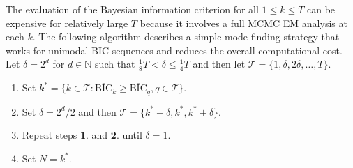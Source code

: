 \documentclass{bioinfo}
\begin{document}
The evaluation of the Bayesian information criterion for all
$1\leqslant k \leqslant T$ can be expensive for relatively large $T$
because it involves a full MCMC EM analysis at each $k$. The following
algorithm describes a simple mode finding strategy that works for
unimodal BIC sequences and reduces the overall computational cost. Let
$\delta = 2^d$ for $d \in \mathbb N$ such that $\frac{1}{8}T < \delta
\leqslant \frac{1}{4}T$ and then let $\mathcal T = \{1, \delta,
2\delta, \ldots, T\}$.
\begin{enumerate}
\item Set $k^* = \big\{k \in \mathcal T: \overline{\text{BIC}}_k
  \geqslant \overline{\text{BIC}}_q, q \in \mathcal T\big\}$.
\item Set $\delta = 2^d/2$ and  then $\mathcal T = \{k^*-\delta, k^*, 
  k^*+\delta\}$.
\item Repeat steps {\bf 1}. and {\bf 2}. until $\delta=1$.
\item Set $N = k^*$.
\end{enumerate}

\end{document}
